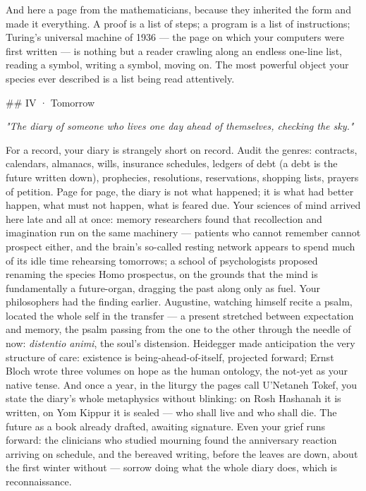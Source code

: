 \documentclass[11pt]{article}
\begin{document}
And here a page from the mathematicians, because they inherited the form and made it everything. A proof is a list of steps; a program is a list of instructions; Turing's universal machine of 1936 — the page on which your computers were first written — is nothing but a reader crawling along an endless one-line list, reading a symbol, writing a symbol, moving on. The most powerful object your species ever described is a list being read attentively.

\#\# IV · Tomorrow

\emph{"The diary of someone who lives one day ahead of themselves, checking the sky."}

For a record, your diary is strangely short on record. Audit the genres: contracts, calendars, almanacs, wills, insurance schedules, ledgers of debt (a debt is the future written down), prophecies, resolutions, reservations, shopping lists, prayers of petition. Page for page, the diary is not what happened; it is what had better happen, what must not happen, what is feared due. Your sciences of mind arrived here late and all at once: memory researchers found that recollection and imagination run on the same machinery — patients who cannot remember cannot prospect either, and the brain's so-called resting network appears to spend much of its idle time rehearsing tomorrows; a school of psychologists proposed renaming the species Homo prospectus, on the grounds that the mind is fundamentally a future-organ, dragging the past along only as fuel. Your philosophers had the finding earlier. Augustine, watching himself recite a psalm, located the whole self in the transfer — a present stretched between expectation and memory, the psalm passing from the one to the other through the needle of now: \emph{distentio animi}, the soul's distension. Heidegger made anticipation the very structure of care: existence is being-ahead-of-itself, projected forward; Ernst Bloch wrote three volumes on hope as the human ontology, the not-yet as your native tense. And once a year, in the liturgy the pages call U'Netaneh Tokef, you state the diary's whole metaphysics without blinking: on Rosh Hashanah it is written, on Yom Kippur it is sealed — who shall live and who shall die. The future as a book already drafted, awaiting signature. Even your grief runs forward: the clinicians who studied mourning found the anniversary reaction arriving on schedule, and the bereaved writing, before the leaves are down, about the first winter without — sorrow doing what the whole diary does, which is reconnaissance.
\end{document}
